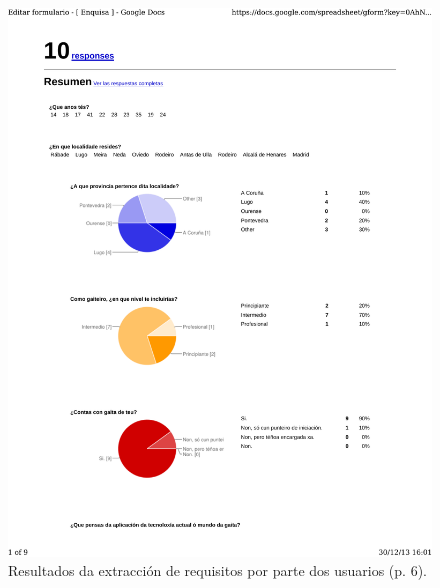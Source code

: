   \begin{figure}[htbp]
   \centering
   \includegraphics[scale=0.7,page=6,keepaspectratio=true]{./imagenes/enquisa.pdf}
   \caption{Resultados da extracción de requisitos por parte dos usuarios (p. 6).}
   \label{figura:ResultadosExtraccionRequisitosUsuarios6}
  \end{figure}

